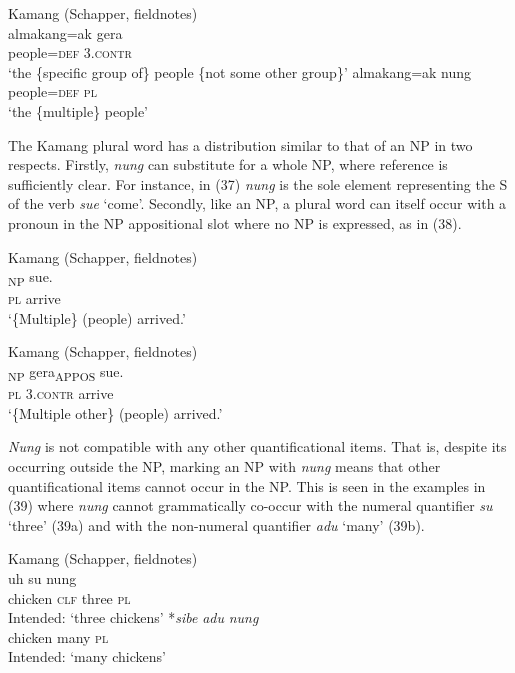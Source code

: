 \ea%
\label{ex:36}
Kamang (Schapper, fieldnotes)\\
\ea
\gll almakang=ak gera  \\
 people=\textsc{def} \textsc{3.contr}   \\
\glt `the \{specific group of\} people \{not some other group\}'
\ex
\gll almakang=ak nung \\
  people=\textsc{def} \textsc{pl}   \\
\glt  `the \{multiple\} people'
\z
\z






The Kamang plural word has a distribution similar to that of an NP in two respects. Firstly, \textit{nung} can substitute for a whole NP, where reference is sufficiently clear. For instance, in (37) \textit{nung} is the sole element representing the S of the verb \textit{sue} `come'. Secondly, like an NP, a plural word can itself occur with a pronoun in the NP appositional slot where no NP is expressed, as in (38).


\ea%
\label{ex:37}
Kamang (Schapper, fieldnotes)\\
\gll  [Nung]\textsubscript{NP} sue. \\
   \textsc{pl} arrive  \\
\glt `\{Multiple\} (people) arrived.'
\z







\ea%
\label{ex:38}
Kamang (Schapper, fieldnotes)\\
\gll  [{Nung}]\textsubscript{NP} {gera}\textsubscript{APPOS} sue. \\
   \textsc{pl} \textsc{3.contr} arrive  \\
\glt `\{Multiple other\} (people) arrived.'
\z






\textit{Nung} is not compatible with any other quantificational items. That is, despite its occurring outside the NP, marking an NP with \textit{nung} means that other quantificational items cannot occur in the NP. This is seen in the examples in (39) where \textit{nung} cannot grammatically co-occur with the numeral quantifier \textit{su} `three' (39a) and with the non-numeral quantifier \textit{adu} `many' (39b).


\ea%
\label{ex:39}
Kamang (Schapper, fieldnotes)\\
\ea
{} uh su {nung}\\
   chicken \textsc{clf} three \textsc{pl} \\
\glt Intended: `three chickens'
\ex
\gll
*\textit{sibe} \textit{adu} \textit{nung}\\
    chicken many   \textsc{pl}\\
\glt  Intended: `many chickens'
 \z
 \z




